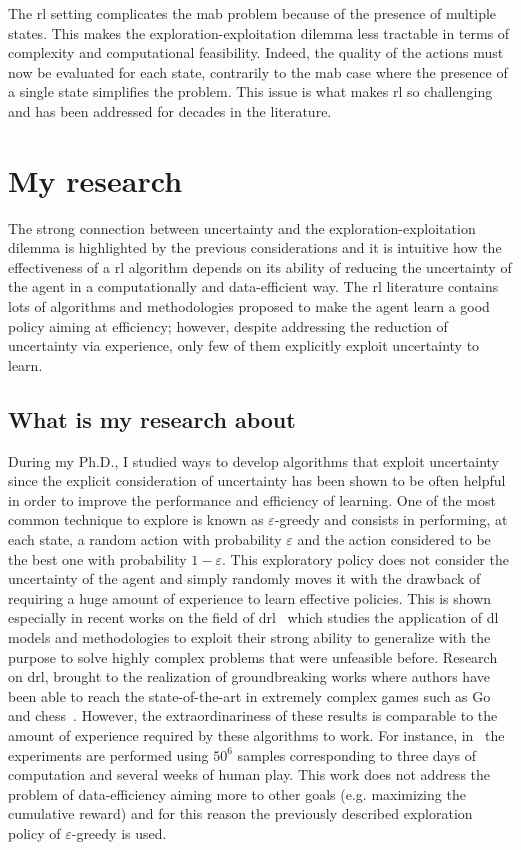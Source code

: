 The \gls{rl} setting complicates the \gls{mab} problem because of the presence of multiple states. This makes the exploration-exploitation dilemma less tractable in terms of complexity and computational feasibility. Indeed, the quality of the actions must now be evaluated for each state, contrarily to the \gls{mab} case where the presence of a single state simplifies the problem. This issue is what makes \gls{rl} so challenging and has been addressed for decades in the literature.

\section{My research}
The strong connection between uncertainty and the exploration-exploitation dilemma is highlighted by the previous considerations and it is intuitive how the effectiveness of a \gls{rl} algorithm depends on its ability of reducing the uncertainty of the agent in a computationally and data-efficient way. The \gls{rl} literature contains lots of algorithms and methodologies proposed to make the agent learn a good policy aiming at efficiency; however, despite addressing the reduction of uncertainty via experience, only few of them explicitly exploit uncertainty to learn.

\subsection{What is my research about}
During my Ph.D., I studied ways to develop algorithms that exploit uncertainty since the explicit consideration of uncertainty has been shown to be often helpful in order to improve the performance and efficiency of learning. One of the most common technique to explore is known as $\varepsilon$-greedy and consists in performing, at each state, a random action with probability $\varepsilon$ and the action considered to be the best one with probability $1 - \varepsilon$. This exploratory policy does not consider the uncertainty of the agent and simply randomly moves it with the drawback of requiring a huge amount of experience to learn effective policies. This is shown especially in recent works on the field of \gls{drl}~\cite{mnih2015human, van2016deep, wang2015dueling} which studies the application of \gls{dl} models and methodologies to exploit their strong ability to generalize with the purpose to solve highly complex problems that were unfeasible before. Research on \gls{drl}, brought to the realization of groundbreaking works where authors have been able to reach the state-of-the-art in extremely complex games such as Go~\cite{silver2016mastering, silver2017mastering} and chess~\cite{silver2017chess}.
However, the extraordinariness of these results is comparable to the amount of experience required by these algorithms to work. For instance, in~\cite{mnih2015human} the experiments are performed using $50^6$ samples corresponding to three days of computation and several weeks of human play. This work does not address the problem of data-efficiency aiming more to other goals (e.g. maximizing the cumulative reward) and for this reason the previously described exploration policy of $\varepsilon$-greedy is used.

